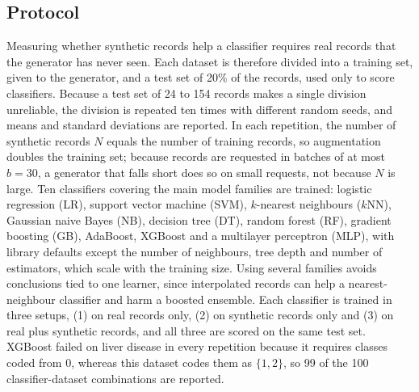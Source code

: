 \documentclass[conference]{IEEEtran}
\begin{document}
\subsection{Protocol}
Measuring whether synthetic records help a classifier requires real records that the generator has never seen. Each dataset is therefore divided into a training set, given to the generator, and a test set of 20\% of the records, used only to score classifiers. Because a test set of 24 to 154 records makes a single division unreliable, the division is repeated ten times with different random seeds, and means and standard deviations are reported. In each repetition, the number of synthetic records $N$ equals the number of training records, so augmentation doubles the training set; because records are requested in batches of at most $b=30$, a generator that falls short does so on small requests, not because $N$ is large. Ten classifiers covering the main model families are trained: logistic regression (LR), support vector machine (SVM), $k$-nearest neighbours ($k$NN), Gaussian naive Bayes (NB), decision tree (DT), random forest (RF), gradient boosting (GB), AdaBoost, XGBoost and a multilayer perceptron (MLP), with library defaults except the number of neighbours, tree depth and number of estimators, which scale with the training size. Using several families avoids conclusions tied to one learner, since interpolated records can help a nearest-neighbour classifier and harm a boosted ensemble. Each classifier is trained in three setups, (1) on real records only, (2) on synthetic records only and (3) on real plus synthetic records, and all three are scored on the same test set. XGBoost failed on liver disease in every repetition because it requires classes coded from 0, whereas this dataset codes them as $\{1,2\}$, so 99 of the 100 classifier-dataset combinations are reported.
\end{document}

